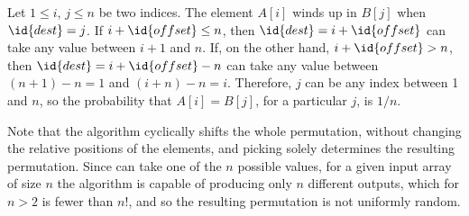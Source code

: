 Let $1\le i$, $j\le n$ be two indices.
The element $A[i]$ winds up in $B[j]$ when $\id{dest}=j$.
If $i+\id{offset}\le n$, then $\id{dest}=i+\id{offset}$ can take any value between $i+1$ and $n$.
If, on the other hand, $i+\id{offset}>n$, then $\id{dest}=i+\id{offset}-n$ can take any value between $(n+1)-n=1$ and $(i+n)-n=i$.
Therefore, $j$ can be any index between 1 and $n$, so the probability that $A[i]=B[j]$, for a particular $j$, is $1/n$.

Note that the algorithm cyclically shifts the whole permutation, without changing the relative positions of the elements, and picking  solely determines the resulting permutation.
Since  can take one of the $n$ possible values, for a given input array of size $n$ the algorithm is capable of producing only $n$ different outputs, which for $n>2$ is fewer than $n!$, and so the resulting permutation is not uniformly random.
